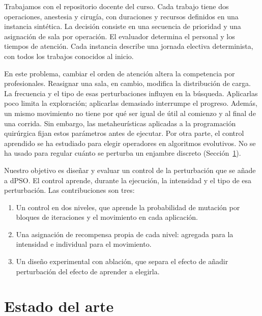 \documentclass[10pt,a4paper]{article}
\begin{document}
Trabajamos con el repositorio docente del curso. Cada trabajo tiene dos operaciones, anestesia
y cirugía, con duraciones y recursos definidos en una instancia sintética. La decisión consiste en
una secuencia de prioridad y una asignación de sala por operación. El evaluador determina el
personal y los tiempos de atención. Cada instancia describe una jornada electiva determinista,
con todos los trabajos conocidos al inicio.

En este problema, cambiar el orden de atención altera la competencia por profesionales.
Reasignar una sala, en cambio, modifica la distribución de carga. La frecuencia y el tipo de esas
perturbaciones influyen en la búsqueda. Aplicarlas poco limita la exploración; aplicarlas
demasiado interrumpe el progreso. Además, un mismo movimiento no tiene por qué ser igual de
útil al comienzo y al final de una corrida. Sin embargo, las metaheurísticas aplicadas a la
programación quirúrgica fijan estos parámetros antes de ejecutar. Por otra parte, el control
aprendido se ha estudiado para elegir operadores en algoritmos evolutivos. No se ha usado para
regular cuánto se perturba un enjambre discreto (Sección~\ref{sec:arte}).

Nuestro objetivo es diseñar y evaluar un control de la perturbación que se añade a dPSO. El
control aprende, durante la ejecución, la intensidad y el tipo de esa perturbación. Las
contribuciones son tres:
\begin{enumerate}
\setlength{\itemsep}{0pt}
\item Un control en dos niveles, que aprende la probabilidad de mutación por bloques de
iteraciones y el movimiento en cada aplicación.
\item Una asignación de recompensa propia de cada nivel: agregada para la intensidad e
individual para el movimiento.
\item Un diseño experimental con ablación, que separa el efecto de añadir perturbación del
efecto de aprender a elegirla.
\end{enumerate}

\section{Estado del arte}
\label{sec:arte}
\end{document}
